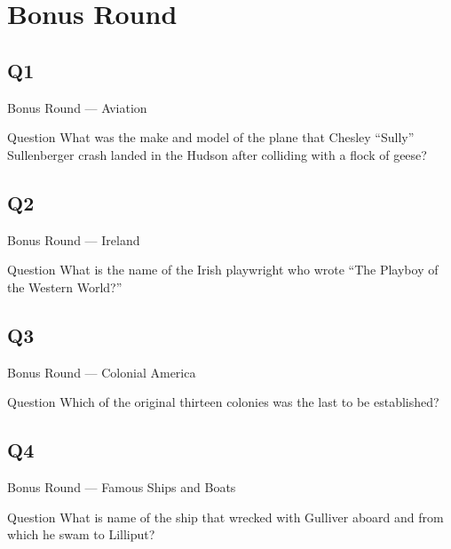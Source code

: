 \documentclass[11pt]{beamer}
\begin{document}
\section{Bonus Round}
\subsection*{Q1}
\begin{frame}[t]{Bonus Round --- Aviation}
    \vspace{-0.5em}
    \begin{block}{Question}
        What was the make and model of the plane that Chesley ``Sully'' Sullenberger crash landed in the Hudson after colliding with a flock of geese?
    \end{block}
\end{frame}
\subsection*{Q2}
\begin{frame}[t]{Bonus Round --- Ireland}
    \vspace{-0.5em}
    \begin{block}{Question}
        What is the name of the Irish playwright who wrote ``The Playboy of the Western World?''
    \end{block}
\end{frame}
\subsection*{Q3}
\begin{frame}[t]{Bonus Round --- Colonial America}
    \vspace{-0.5em}
    \begin{block}{Question}
        Which of the original thirteen colonies was the last to be established?
    \end{block}
\end{frame}
\subsection*{Q4}
\begin{frame}[t]{Bonus Round --- Famous Ships and Boats}
    \vspace{-0.5em}
    \begin{block}{Question}
        What is name of the ship that wrecked with Gulliver aboard and from which he swam to Lilliput?
    \end{block}
\end{frame}
\end{document}
